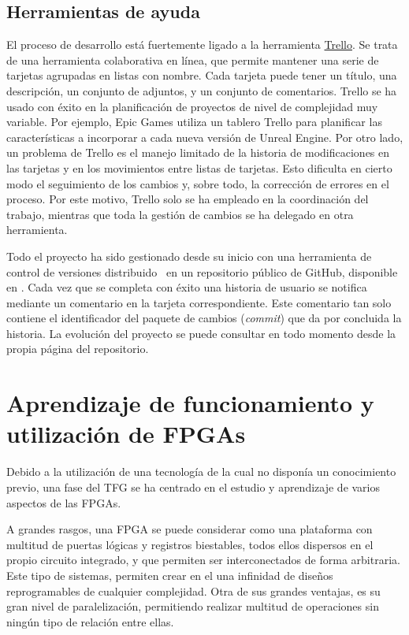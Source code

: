 \subsection{Herramientas de ayuda}
El proceso de desarrollo está fuertemente ligado a la herramienta \href{https://trello.com/}{Trello}. Se trata de una herramienta colaborativa en línea, que permite mantener una serie de tarjetas agrupadas en listas con nombre. Cada tarjeta puede tener un título, una descripción, un conjunto de adjuntos, y un conjunto de comentarios. Trello se ha usado con éxito en la planificación de proyectos de nivel de complejidad muy variable. Por ejemplo, Epic Games utiliza un tablero Trello para planificar las características a incorporar a cada nueva versión de Unreal Engine. Por otro lado, un problema de Trello es el manejo limitado de la historia de modificaciones en las tarjetas y en los movimientos entre listas de tarjetas. Esto dificulta en cierto modo el seguimiento de los cambios y, sobre todo, la corrección de errores en el proceso. Por este motivo, Trello solo se ha empleado en la coordinación del trabajo, mientras que toda la gestión de cambios se ha delegado en otra herramienta.

Todo el proyecto ha sido gestionado desde su inicio con una herramienta de control de versiones distribuido~\cite{scottchaconbenstraub2018} en un repositorio público de GitHub, disponible en \thegitrepo. Cada vez que se completa con éxito una historia de usuario se notifica mediante un comentario en la tarjeta correspondiente. Este comentario tan solo contiene el identificador del paquete de cambios (\emph{commit}) que da por concluida la historia. La evolución del proyecto se puede consultar  en todo momento desde la propia página del repositorio.


\section{Aprendizaje de funcionamiento y utilización de FPGAs}
Debido a la utilización de una tecnología de la cual no disponía un conocimiento previo, una fase del TFG se ha centrado en el estudio y aprendizaje de varios aspectos de las FPGAs.

A grandes rasgos, una FPGA\cite{kuon2008fpga} se puede considerar como una plataforma con multitud de puertas lógicas y registros biestables, todos ellos dispersos en el propio circuito integrado, y que permiten ser interconectados de forma arbitraria. Este tipo de sistemas, permiten crear en el una infinidad de diseños reprogramables de cualquier complejidad. Otra de sus grandes ventajas, es su gran nivel de paralelización, permitiendo realizar multitud de operaciones sin ningún tipo de relación entre ellas.

